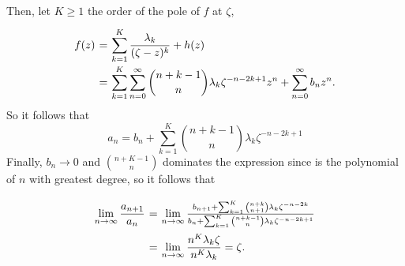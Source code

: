 Then, let $K\geq 1$ the order of the pole of $f$ at $\zeta$,
\[ \everymath{\displaystyle}
\arraycolsep=1.8pt\def\arraystretch{2.5}
\begin{array}{rcl}
    f(z) & = & \sum_{k = 1}^{K} \frac{\lambda_k}{(\zeta - z)^k} + h(z)\\
    & = & \sum_{k = 1}^{K}\sum_{n = 0}^{\infty} \binom{n+k-1}{n}\lambda_k \zeta^{-n-2k+1} z^n + \sum_{n = 0}^{\infty} b_n z^n.
\end{array} \]
So it follows that
\[ a_n = b_n + \sum_{k = 1}^{K} \binom{n+k-1}{n}\lambda_k \zeta^{-n-2k+1} \]
Finally, $b_n \to 0$ and $\binom{n+K-1}{n}$ dominates the expression since is the polynomial of $n$ with greatest degree, so it follows that
\[ \everymath{\displaystyle}
\arraycolsep=1.8pt\def\arraystretch{2.5}
\begin{array}{rcl}
    \lim_{n\to\infty} \frac{a_{n+1}}{a_n} & = & \lim_{n\to\infty} \tfrac{b_{n+1} + \sum_{k = 1}^{K} \binom{n+k}{n+1}\lambda_k \zeta^{-n-2k}}{b_n + \sum_{k = 1}^{K} \binom{n+k-1}{n}\lambda_k \zeta^{-n-2k+1}}\\
    & = & \lim_{n\to\infty} \frac{n^{K}\lambda_k \zeta}{n^{K}\lambda_k} = \zeta.
\end{array} \]